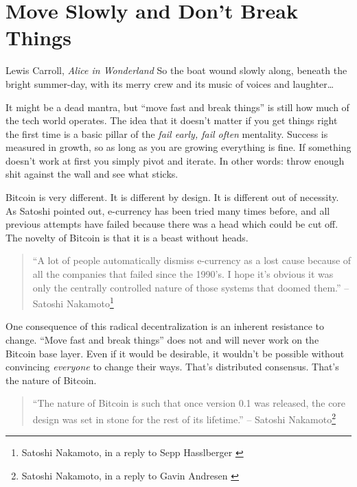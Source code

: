 \chapter{Move Slowly and Don't Break Things}
\label{les:18}

\begin{chapquote}{Lewis Carroll, \textit{Alice in Wonderland}}
So the boat wound slowly along, beneath the bright summer-day, with its merry crew and its music of voices and laughter\ldots
\end{chapquote}

It might be a dead mantra, but \enquote{move fast and break things} is still how
much of the tech world operates. The idea that it doesn't matter if you
get things right the first time is a basic pillar of the \textit{fail early,
fail often} mentality. Success is measured in growth, so as long as you
are growing everything is fine. If something doesn't work at first you
simply pivot and iterate. In other words: throw enough shit against the
wall and see what sticks.

Bitcoin is very different. It is different by design. It is different
out of necessity. As Satoshi pointed out, e-currency has been tried
many times before, and all previous attempts have failed because there
was a head which could be cut off. The novelty of Bitcoin is that it is
a beast without heads.

\begin{samepage}\begin{quotation}
\enquote{A lot of people automatically dismiss e-currency as a lost cause
because of all the companies that failed since the 1990's. I hope it's
obvious it was only the centrally controlled nature of those systems
that doomed them.}
\flushright -- Satoshi Nakamoto\footnote{Satoshi Nakamoto, in a reply to Sepp Hasslberger \cite{satoshi-centralized-nature}}
\end{quotation}\end{samepage}

One consequence of this radical decentralization is an inherent
resistance to change. \enquote{Move fast and break things} does not and will
never work on the Bitcoin base layer. Even if it would be desirable, it
wouldn't be possible without convincing \textit{everyone} to change their ways.
That's distributed consensus. That's the nature of Bitcoin.

\begin{samepage}\begin{quotation}
\enquote{The nature of Bitcoin is such that once version 0.1 was released, the
core design was set in stone for the rest of its lifetime.}
\flushright -- Satoshi Nakamoto\footnote{Satoshi Nakamoto, in a reply to Gavin Andresen \cite{satoshi-centralized-nature}}
\end{quotation}\end{samepage}

